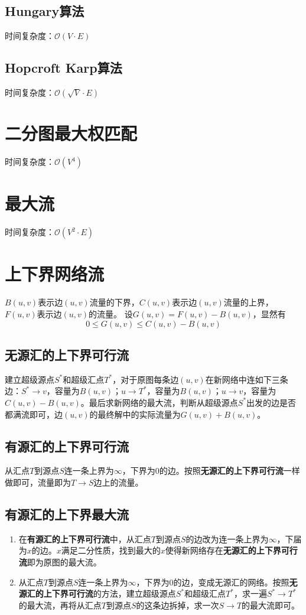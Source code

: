 \documentclass[openany, a4paper, 10pt]{book}
\begin{document}
\begin{spacing}{1.1}
			\subsection{Hungary算法}
				时间复杂度：$\mathcal{O}(V \cdot E)$
				
			\subsection{Hopcroft Karp算法}
				时间复杂度：$\mathcal{O}(\sqrt{V} \cdot E)$
				
		\section{二分图最大权匹配}
			时间复杂度：$\mathcal{O}(V^4)$
			
		\section{最大流}
			时间复杂度：$\mathcal{O}(V^2 \cdot E)$
			
		\section{上下界网络流}
			$B(u,v)$表示边$(u,v)$流量的下界，$C(u,v)$表示边$(u,v)$流量的上界，$F(u,v)$表示边$(u,v)$的流量。
			设$G(u,v) = F(u,v) - B(u,v)$，显然有
			$$0 \leq G(u,v) \leq C(u,v)-B(u,v)$$
		\subsection{无源汇的上下界可行流}
			建立超级源点$S^*$和超级汇点$T^*$，对于原图每条边$(u,v)$在新网络中连如下三条边：$S^* \rightarrow v$，容量为$B(u,v)$；$u \rightarrow T^*$，容量为$B(u,v)$；$u \rightarrow v$，容量为$C(u,v) - B(u,v)$。最后求新网络的最大流，判断从超级源点$S^*$出发的边是否都满流即可，边$(u,v)$的最终解中的实际流量为$G(u,v)+B(u,v)$。
		\subsection{有源汇的上下界可行流}
			从汇点$T$到源点$S$连一条上界为$\infty$，下界为$0$的边。按照\textbf{无源汇的上下界可行流}一样做即可，流量即为$T \rightarrow S$边上的流量。
		\subsection{有源汇的上下界最大流}
			\begin{enumerate}
				\item 在\textbf{有源汇的上下界可行流}中，从汇点$T$到源点$S$的边改为连一条上界为$\infty$，下届为$x$的边。$x$满足二分性质，找到最大的$x$使得新网络存在\textbf{无源汇的上下界可行流}即为原图的最大流。
				\item 从汇点$T$到源点$S$连一条上界为$\infty$，下界为$0$的边，变成无源汇的网络。按照\textbf{无源汇的上下界可行流}的方法，建立超级源点$S^*$和超级汇点$T^*$，求一遍$S^* \rightarrow T^*$的最大流，再将从汇点$T$到源点$S$的这条边拆掉，求一次$S \rightarrow T$的最大流即可。
			\end{enumerate}

\end{spacing}
\end{document}
